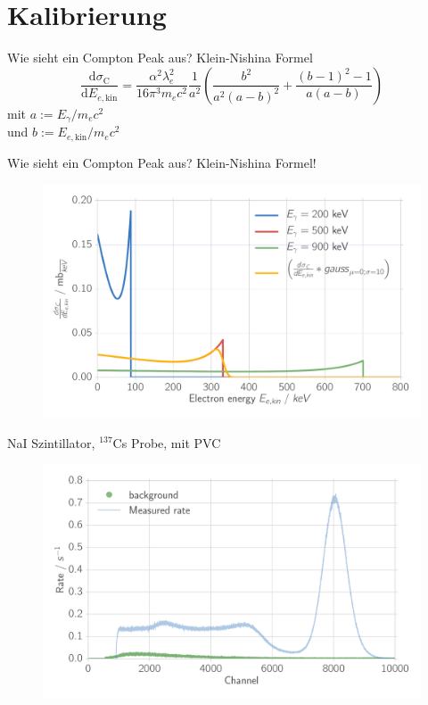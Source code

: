 \documentclass[xcolor=x11names,compress]{beamer}
\renewcommand{\(}{\begin{columns}}
\renewcommand{\)}{\end{columns}}
\newcommand{\<}[1]{\begin{column}{#1}}
\renewcommand{\>}{\end{column}}
\begin{document}
\section{Kalibrierung}
\begin{frame}[t]{Wie sieht ein Compton Peak aus?}
    Klein-Nishina Formel
\begin{equation}
    \frac{\text{d} \sigma_\text{C}}{\text{d} E_{e, \text{kin}}} 
    = \frac{\alpha^2 \lambda_e^2}{16 \pi^3 m_e c^2}  \frac{1}{a^2}\left(
        \frac{b^2}{a^2(a - b)^2} + \frac{(b - 1)^2 - 1}{a (a - b)} \right) 
    \label{eq:dode}
\end{equation}
mit $a := E_\gamma / m_ec^2$ \\ 
und $b := E_{e, \text{kin}} / m_ec^2$ 
\end{frame}

\begin{frame}[t]{Wie sieht ein Compton Peak aus? Klein-Nishina Formel!}
\begin{figure}[htpb]
    \centering
    \includegraphics[width=1.0\linewidth]{../analysis/figures/theory_dsde}
\label{fig:theory_kn}
\end{figure}
\end{frame}

\begin{frame}[t]{NaI Szintillator, $^{137}$Cs Probe, mit PVC}
 \begin{figure}[htpb]
    \centering
    \includegraphics[width=1.0\linewidth]{../analysis/figures/histo_na_137cs_nolegend}
    \label{fig:histo_na_137cs}
\end{figure}
\end{frame}
\end{document}
